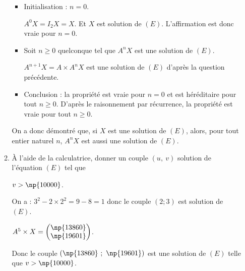 \documentclass[12pt]{cornouaille}
\begin{document}
\begin{exercice}
\begin{enumerate}
\begin{enumerate}
\begin{solution}
		\begin{itemize}
		\item Initialisation : $n=0$.
		
$A^0X=I_2X=X$. Et $X$ est solution de $(E)$. L'affirmation est donc vraie pour $n=0$.
		
		\item Soit $n \geqslant 0$ quelconque tel que $A^nX$ est une solution de $(E)$. 
		
$A^{n+1}X=A \times A^nX$ est une solution de $(E)$ d'après la question précédente.
		\item Conclusion : la propriété est vraie pour $n=0$ et est
héréditaire pour tout $n\geqslant 0$. D'après le raisonnement par récurrence, la propriété est vraie pour tout $n\geqslant 0$.
		\end{itemize}
		
On a donc démontré que, si $X$ est une solution de $(E)$, alors, pour tout entier naturel $n$, $A^nX$ est aussi une solution de $(E)$.
\end{solution}
		\item À l'aide de la calculatrice, donner un couple $(u,~v)$ solution de l'équation $(E)$ tel que
		
 $v > \np{10000}$.

\begin{solution}
On a : $3^2-2 \times 2^2=9-8=1$ donc le couple $(2;3)$ est solution de $(E)$.
		
$A^5 \times X = \begin{pmatrix} \np{13860}\\ \np{19601}\end{pmatrix}$. 
		
Donc le couple $(\np{13860}~;~\np{19601})$ est une solution de $(E)$ telle que $v > \np{10000}$.
\end{solution}
	\end{enumerate}
\end{enumerate}

	
\end{exercice}
\end{document}

